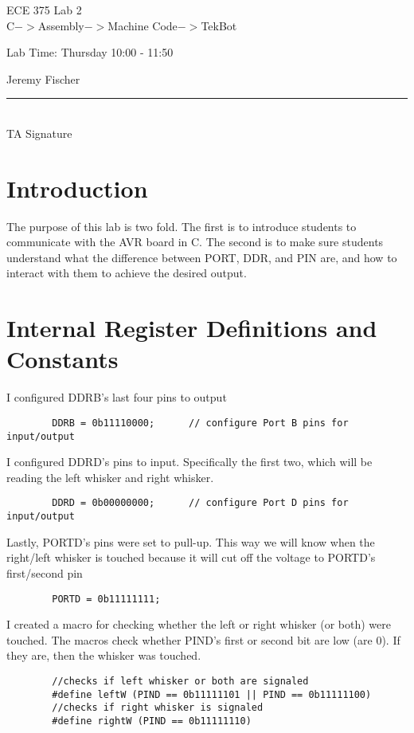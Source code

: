 \documentclass[12pt,letterpaper]{article}
\begin{document}
\begin{titlepage}
    \vspace*{4cm}
    \begin{flushright}
    {\huge
        ECE 375 Lab 2\\[1cm]
    }
    {\large
       C$->$Assembly$->$Machine Code$->$TekBot
    }
    \end{flushright}
    \begin{flushleft}
    Lab Time: Thursday  10:00 - 11:50
    \end{flushleft}
    \begin{flushright}
    Jeremy Fischer

    \vfill
    \rule{5in}{.5mm}\\
    TA Signature
    \end{flushright}

\end{titlepage}

\section{Introduction}
The purpose of this lab is two fold.
The first is to introduce students to communicate with the AVR board in C.
The second is to make sure students understand what the difference between PORT, DDR, and PIN are, and how to interact with them to achieve the desired output.



\section{Internal Register Definitions and Constants}
I configured DDRB's last four pins to output
    \begin{verbatim} 
        DDRB = 0b11110000;      // configure Port B pins for input/output
    \end{verbatim} 
I configured DDRD's pins to input.
Specifically the first two, which will be reading the left whisker and right whisker.
    \begin{verbatim}    
        DDRD = 0b00000000;      // configure Port D pins for input/output
    \end{verbatim} 
Lastly, PORTD's pins were set to pull-up.
This way we will know when the right/left whisker is touched because it will cut off the voltage to PORTD's first/second pin
    \begin{verbatim} 
        PORTD = 0b11111111;
    \end{verbatim} 
I created a macro for checking whether the left or right whisker (or both) were touched.
The macros check whether PIND's first or second bit are low (are 0).
If they are, then the whisker was touched. 
    \begin{verbatim}
        //checks if left whisker or both are signaled
        #define leftW (PIND == 0b11111101 || PIND == 0b11111100) 
        //checks if right whisker is signaled
        #define rightW (PIND == 0b11111110)
    \end{verbatim}
\end{document}
